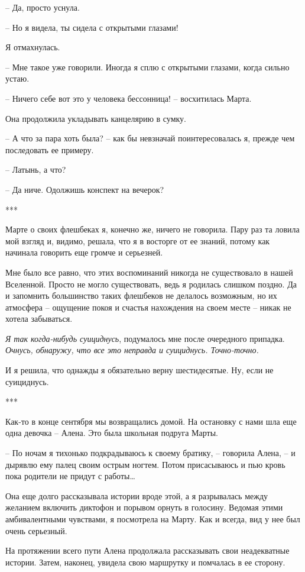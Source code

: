 \documentclass[
]{book}
\begin{document}
-- Да, просто уснула.

-- Но я видела, ты сидела с открытыми глазами!

Я отмахнулась.

-- Мне такое уже говорили. Иногда я сплю с открытыми глазами, когда сильно устаю.

-- Ничего себе вот это у человека бессонница! -- восхитилась Марта.

Она продолжила укладывать канцелярию в сумку.

-- А что за пара хоть была? -- как бы невзначай поинтересовалась я, прежде чем последовать ее примеру.

-- Латынь, а что?

-- Да ниче. Одолжишь конспект на вечерок?

***

Марте о своих флешбеках я, конечно же, ничего не говорила. Пару раз та ловила мой взгляд и, видимо, решала, что я в восторге от ее знаний, потому как начинала говорить еще громче и серьезней.

Мне было все равно, что этих воспоминаний никогда не существовало в нашей Вселенной. Просто не могло существовать, ведь я родилась слишком поздно. Да и запомнить большинство таких флешбеков не делалось возможным, но их атмосфера -- ощущение покоя и счастья нахождения на своем месте -- никак не хотела забываться.

\emph{Я так когда-нибудь суициднусь}, подумалось мне после очередного припадка. \emph{Очнусь, обнаружу, что все это неправда и суициднусь. Точно-точно.}

И я решила, что однажды я обязательно верну шестидесятые. Ну, если не суициднусь.

***

Как-то в конце сентября мы возвращались домой. На остановку с нами шла еще одна девочка -- Алена. Это была школьная подруга Марты.

-- По ночам я тихонько подкрадываюсь к своему братику, -- говорила Алена, -- и дырявлю ему палец своим острым ногтем. Потом присасываюсь и пью кровь пока родители не придут с работы\ldots{}

Она еще долго рассказывала истории вроде этой, а я разрывалась между желанием включить диктофон и порывом орнуть в голосину. Ведомая этими амбивалентными чувствами, я посмотрела на Марту. Как и всегда, вид у нее был очень серьезный.

На протяжении всего пути Алена продолжала рассказывать свои неадекватные истории. Затем, наконец, увидела свою маршрутку и помчалась в ее сторону.
\end{document}
